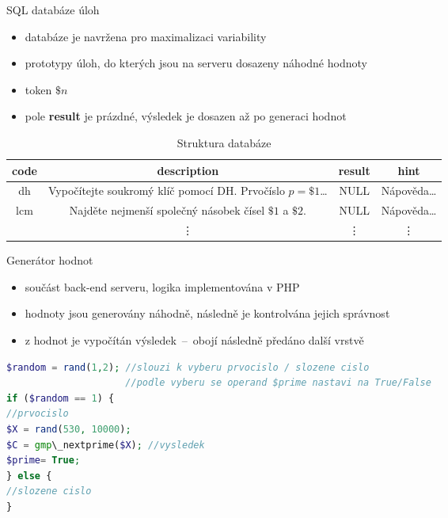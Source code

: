 \documentclass[aspectratio=1610]{beamer}
\begin{document}
\begin{frame}{SQL databáze úloh}
    \begin{itemize}
        \item databáze je navržena pro maximalizaci variability
        \item prototypy úloh, do kterých jsou na serveru dosazeny náhodné hodnoty
        \item token \textbf{$\$n$}
        \item pole \textbf{result} je prázdné, výsledek je dosazen až po generaci hodnot
    \end{itemize}
    \begin{table}
        \caption{Struktura databáze}
        \begin{tabular}[pos]{|c|c|c|c|}
            \hline
            \textbf{code} & \textbf{description} & \textbf{result} & \textbf{hint} \\
            \hline
            \hline
            dh & Vypočítejte soukromý klíč pomocí DH. Prvočíslo $p=\$1$\dots & NULL & Nápověda\dots \\
            \hline
            lcm & Najděte nejmenší společný násobek čísel $\$1$ a $\$2$. & NULL & Nápověda\dots \\
            \hline
            \smash{\vdots} & \vdots & \vdots & \vdots \\
            \hline
        \end{tabular}
    \end{table}
\end{frame}


\begin{frame}[fragile]{Generátor hodnot}
    \begin{itemize}
        \item součást back-end serveru, logika implementována v PHP
        \item hodnoty jsou generovány náhodně, následně je kontrolvána jejich správnost
        \item z hodnot je vypočítán výsledek~--~obojí následně předáno další vrstvě
    \end{itemize}
    \begin{lstlisting}[language=php, title=ukázka kódu]
$random = rand(1,2); //slouzi k vyberu prvocislo / slozene cislo
                     //podle vyberu se operand $prime nastavi na True/False
if ($random == 1) {
//prvocislo
$X = rand(530, 10000);
$C = gmp\_nextprime($X); //vysledek
$prime= True;
} else {
//slozene cislo
}
    \end{lstlisting}
\end{frame}
\end{document}
